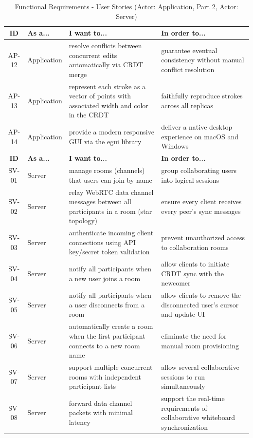 \documentclass[a4paper,11pt,twoside]{report}
\theoremstyle{definition}
\begin{document}
\begin{table}[H]
	\centering
	\caption{Functional Requirements - User Stories (Actor: Application, Part 2, Actor: Server)}
	\begin{tabular}{|c|p{}|p{}|p{}|}
		\hline
		\textbf{ID} & \textbf{As a...} & \textbf{I want to...} & \textbf{In order to...} \\
		\hline
		AP-12 & Application & resolve conflicts between concurrent edits automatically via CRDT merge & guarantee eventual consistency without manual conflict resolution \\
		\hline
		AP-13 & Application & represent each stroke as a vector of points with associated width and color in the CRDT & faithfully reproduce strokes across all replicas \\
		\hline
		AP-14 & Application & provide a modern responsive GUI via the egui library & deliver a native desktop experience on macOS and Windows \\

		\hline
		\textbf{ID} & \textbf{As a...} & \textbf{I want to...} & \textbf{In order to...} \\
		\hline
		SV-01 & Server & manage rooms (channels) that users can join by name & group collaborating users into logical sessions \\
		\hline
		SV-02 & Server & relay WebRTC data channel messages between all participants in a room (star topology) & ensure every client receives every peer's sync messages \\
		\hline
		SV-03 & Server & authenticate incoming client connections using API key/secret token validation & prevent unauthorized access to collaboration rooms \\
		\hline
		SV-04 & Server & notify all participants when a new user joins a room & allow clients to initiate CRDT sync with the newcomer \\
		\hline
		SV-05 & Server & notify all participants when a user disconnects from a room & allow clients to remove the disconnected user's cursor and update UI \\
		\hline
		SV-06 & Server & automatically create a room when the first participant connects to a new room name & eliminate the need for manual room provisioning \\
		\hline
		SV-07 & Server & support multiple concurrent rooms with independent participant lists & allow several collaborative sessions to run simultaneously \\
		\hline
		SV-08 & Server & forward data channel packets with minimal latency & support the real-time requirements of collaborative whiteboard synchronization \\
		\hline
	\end{tabular}
	\label{tab:user-stories-server}
\end{table}
\end{document}
